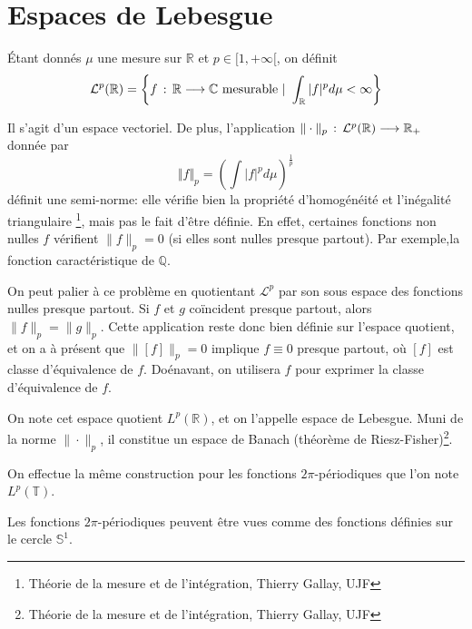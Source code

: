 	\section{Espaces de Lebesgue}
	
		\begin{mydef}
			Étant donnés $\mu$ une mesure sur $\mathbb{R}$ et $p \in [1, +\infty[$, on définit
				$$ \mathcal{L}^{p} (\mathbb{R}) = \left \{ f \, : \, \mathbb{R} \longrightarrow \mathbb{C} \text{ mesurable} ~|~ \int_{\mathbb{R}}|f|^p d\mu < \infty \right \} $$
		\end{mydef}
	
		Il s'agit d'un espace vectoriel. De plus, l'application $\| \cdot \|_p \, : \, \mathcal{L}^p(\mathbb{R}) \longrightarrow \mathbb{R}_+$ donnée par
		 $$\Vert f \Vert_p = \left( \int|f|^pd\mu \right)^{\frac{1}{p}} $$ 
		 définit une semi-norme: elle vérifie bien la propriété d'homogénéité et l'inégalité triangulaire \footnote{Théorie de la mesure et de l'intégration, Thierry Gallay, UJF}, mais pas le fait d'être définie. En effet, certaines fonctions non nulles $f$ vérifient $\|f\|_p = 0$ (si elles sont nulles presque partout). Par exemple,la fonction caractéristique de $\mathbb{Q}$. 
		 
		 On peut palier à ce problème en quotientant $\mathcal{L}^p$ par son sous espace des fonctions nulles presque partout. Si $f$ et $g$ coïncident presque partout, alors
		 $\|f\|_p = \|g\|_p$. Cette application reste donc bien définie sur l'espace quotient, et on a à présent que $ \|[f]\|_p = 0$ implique $f \equiv 0$ presque partout, où $[f]$ est classe d'équivalence de $f$. 
		 Doénavant, on utilisera $f$ pour exprimer la classe d'équivalence de $f$.
		 
		 \begin{mydef} 
		 	On note cet espace quotient $L^p(\mathbb{R})$, et on l'appelle espace de Lebesgue. Muni de la norme $\| \cdot \|_p$, il constitue un espace de Banach (théorème de Riesz-Fisher)\footnote{Théorie de la mesure et de l'intégration, Thierry Gallay, UJF}. 
		 \end{mydef}
		 
		On effectue la même construction pour les fonctions $2\pi$-périodiques que l'on note $L^p(\mathbb{T})$.
		
		\begin{myrem}
			Les fonctions $2\pi$-périodiques peuvent être vues comme des fonctions définies sur le cercle $\mathbb{S}^1$.
		\end{myrem}

		
	
